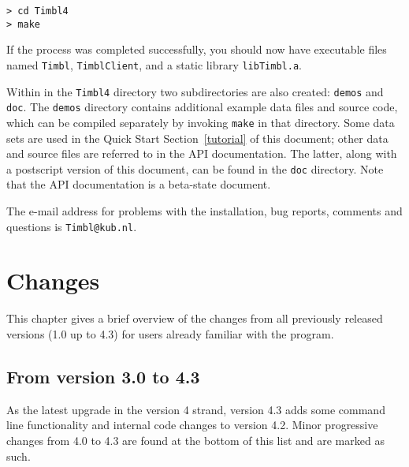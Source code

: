 \documentclass{report}
\begin{document}
{\tt > cd Timbl4} \\
{\tt > make}

If the process was completed successfully, you should now have
executable files named {\tt Timbl}, {\tt TimblClient}, and a
static library {\tt libTimbl.a}.

Within in the {\tt Timbl4} directory two subdirectories are also
created: {\tt demos} and {\tt doc}. The {\tt demos} directory contains
additional example data files and source code, which can be compiled
separately by invoking {\tt make} in that directory. Some data sets
are used in the Quick Start Section~\ref{tutorial} of this document;
other data and source files are referred to in the API
documentation. The latter, along with a postscript version of this
document, can be found in the {\tt doc} directory. Note that the API
documentation is a beta-state document.

The e-mail address for problems with the installation, bug reports,
comments and questions is {\tt Timbl@kub.nl}.

\chapter{Changes}
\label{changes}

This chapter gives a brief overview of the changes from all previously
released versions (1.0 up to 4.3) for users already familiar with the
program.

\section{From version 3.0 to 4.3}

As the latest upgrade in the version 4 strand, version 4.3 adds some
command line functionality and internal code changes to version
4.2. Minor progressive changes from 4.0 to 4.3 are found at the bottom
of this list and are marked as such.
\end{document}
